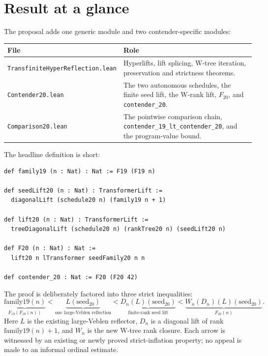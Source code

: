 \documentclass[11pt]{article}
\theoremstyle{definition}
\theoremstyle{remark}
\newcommand{\code}[1]{\texttt{#1}}
\begin{document}
\tableofcontents
\newpage

\section{Result at a glance}

The proposal adds one generic module and two contender-specific modules:

\begin{center}
\small
\begin{tabular}{P{0.38\textwidth}P{0.52\textwidth}}
\toprule
File & Role\\
\midrule
\code{TransfiniteHyper\allowbreak Reflection.lean} & Hyperlifts, lift splicing,
W-tree iteration, preservation and strictness theorems.\\
\code{Contender20.lean} & The two autonomous schedules, the finite seed lift,
the W-rank lift, \(F_{20}\), and \code{contender\_20}.\\
\code{Comparison20.lean} & The pointwise comparison chain,
\code{contender\_19\_lt\_contender\_20}, and the program-value bound.\\
\bottomrule
\end{tabular}
\end{center}

The headline definition is short:

\begin{lstlisting}
def family19 (n : Nat) : Nat := F19 (F19 n)

def seedLift20 (n : Nat) : TransformerLift :=
  diagonalLift (schedule20 n) (family19 n + 1)

def lift20 (n : Nat) : TransformerLift :=
  treeDiagonalLift (schedule20 n) (rankTree20 n) (seedLift20 n)

def F20 (n : Nat) : Nat :=
  lift20 n lTransformer seedFamily20 n n

def contender_20 : Nat := F20 (F20 42)
\end{lstlisting}

The proof is deliberately factored into three strict inequalities:
\begin{equation}\label{eq:chain}
\underbrace{\mathrm{family19}(n)}_{F_{19}(F_{19}(n))}
<\underbrace{L(\mathrm{seed}_{20})}_{\text{one large-Veblen reflection}}
<\underbrace{D_n(L)(\mathrm{seed}_{20})}_{\text{finite-rank seed lift}}
<\underbrace{W_n(D_n)(L)(\mathrm{seed}_{20})}_{F_{20}(n)}.
\end{equation}
Here \(L\) is the existing large-Veblen reflector, \(D_n\) is a diagonal lift
of rank \(\mathrm{family19}(n)+1\), and \(W_n\) is the new W-tree rank closure.
Each arrow is witnessed by an existing or newly proved strict-inflation
property; no appeal is made to an informal ordinal estimate.
\end{document}
